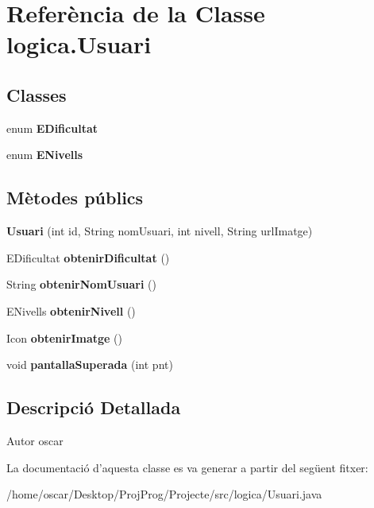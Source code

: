 \hypertarget{classlogica_1_1_usuari}{\section{Referència de la Classe logica.\+Usuari}
\label{classlogica_1_1_usuari}
}
\subsection*{Classes}
\begin{DoxyCompactItemize}
\item 
enum {\bfseries E\+Dificultat}
\item 
enum {\bfseries E\+Nivells}
\end{DoxyCompactItemize}
\subsection*{Mètodes públics}
\begin{DoxyCompactItemize}
\item 
\hypertarget{classlogica_1_1_usuari_a7d61fbf17076f5c75841d30598ee3289}{{\bfseries Usuari} (int id, String nom\+Usuari, int nivell, String url\+Imatge)}\label{classlogica_1_1_usuari_a7d61fbf17076f5c75841d30598ee3289}

\item 
\hypertarget{classlogica_1_1_usuari_a8aaddefb9f6dba6e142426483ade785f}{E\+Dificultat {\bfseries obtenir\+Dificultat} ()}\label{classlogica_1_1_usuari_a8aaddefb9f6dba6e142426483ade785f}

\item 
\hypertarget{classlogica_1_1_usuari_a642304fd209679e1cd3f312eaa06ed9c}{String {\bfseries obtenir\+Nom\+Usuari} ()}\label{classlogica_1_1_usuari_a642304fd209679e1cd3f312eaa06ed9c}

\item 
\hypertarget{classlogica_1_1_usuari_a1af8cdd311f23f556295912d869c1630}{E\+Nivells {\bfseries obtenir\+Nivell} ()}\label{classlogica_1_1_usuari_a1af8cdd311f23f556295912d869c1630}

\item 
\hypertarget{classlogica_1_1_usuari_aa1f96063a4d6a068e2088e6f7339a4fa}{Icon {\bfseries obtenir\+Imatge} ()}\label{classlogica_1_1_usuari_aa1f96063a4d6a068e2088e6f7339a4fa}

\item 
\hypertarget{classlogica_1_1_usuari_a3d2c12a1138df467863c3ff43827bed1}{void {\bfseries pantalla\+Superada} (int pnt)}\label{classlogica_1_1_usuari_a3d2c12a1138df467863c3ff43827bed1}

\end{DoxyCompactItemize}


\subsection{Descripció Detallada}
\begin{DoxyAuthor}{Autor}
oscar 
\end{DoxyAuthor}


La documentació d'aquesta classe es va generar a partir del següent fitxer\+:\begin{DoxyCompactItemize}
\item 
/home/oscar/\+Desktop/\+Proj\+Prog/\+Projecte/src/logica/Usuari.\+java\end{DoxyCompactItemize}
